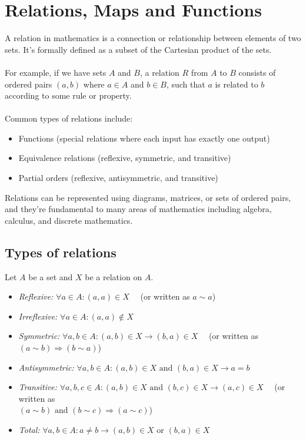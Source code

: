 \section{Relations, Maps and Functions}

A relation in mathematics is a connection or relationship between elements of two sets. It's formally
defined as a subset of the Cartesian product of the sets.
\\\\
For example, if we have sets \(A\) and \(B\), a relation \(R\) from \(A\) to \(B\) consists
of ordered pairs \((a,b)\) where \(a \in A\) and \(b \in B\), such that \(a\) is related to \(b\) according to some rule or property.
\\\\
Common types of relations include:
\begin{itemize}[label =\(-\)]
	\item Functions (special relations where each input has exactly one output)
	\item Equivalence relations (reflexive, symmetric, and transitive)
	\item Partial orders (reflexive, antisymmetric, and transitive)
\end{itemize}

Relations can be represented using diagrams, matrices, or sets of
ordered pairs, and they're fundamental to many areas of mathematics including algebra, calculus, and discrete mathematics.

\subsection{Types of relations}

Let \(A\) be a set and \(X\) be a relation on \(A\).

\begin{itemize}[label =\(-\)]
	\item \emph{Reflexive:} \(\forall a \in A: (a, a) \in X\) \ \ (or written as \(a \sim a\))

	\item \emph{Irreflexive:} \(\forall a \in A: (a, a) \not\in X\)

	\item \emph{Symmetric:} \(\forall a, b \in A: (a, b) \in X \to (b, a) \in X\) \ \ (or written as \((a \sim b) \Rightarrow (b \sim a)\))

	\item \emph{Antisymmetric:} \(\forall a, b \in A: (a, b) \in X \text{ and } (b, a) \in X \to a = b\)

	\item \emph{Transitive:} \(\forall a, b, c \in A: (a, b) \in X \text{ and } (b, c) \in X \to (a, c) \in X\) \ \ (or written as \\\((a \sim b) \text{ and } (b \sim c) \Rightarrow (a \sim c)\))

	\item \emph{Total:} \(\forall a,b \in A: a \neq b \to (a, b) \in X \text{ or } (b, a) \in X\)
\end{itemize}

